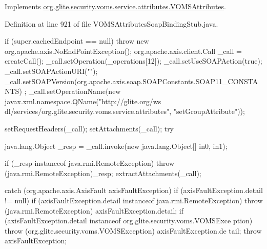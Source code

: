 Implements \hyperlink{interfaceorg_1_1glite_1_1security_1_1voms_1_1service_1_1attributes_1_1VOMSAttributes_aea6d585cbe26db3f11f15cc2b017fb03}{org.glite.security.voms.service.attributes.VOMSAttributes}.



Definition at line 921 of file VOMSAttributesSoapBindingStub.java.


\begin{DoxyCode}
                                                                                 
                                                                                       
                                  {
        if (super.cachedEndpoint == null) {
            throw new org.apache.axis.NoEndPointException();
        }
        org.apache.axis.client.Call _call = createCall();
        _call.setOperation(_operations[12]);
        _call.setUseSOAPAction(true);
        _call.setSOAPActionURI("");
        _call.setSOAPVersion(org.apache.axis.soap.SOAPConstants.SOAP11_CONSTANTS)
      ;
        _call.setOperationName(new javax.xml.namespace.QName("http://glite.org/ws
      dl/services/org.glite.security.voms.service.attributes", "setGroupAttribute"));

        setRequestHeaders(_call);
        setAttachments(_call);
 try {        java.lang.Object _resp = _call.invoke(new java.lang.Object[] {in0, 
      in1});

        if (_resp instanceof java.rmi.RemoteException) {
            throw (java.rmi.RemoteException)_resp;
        }
        extractAttachments(_call);
  } catch (org.apache.axis.AxisFault axisFaultException) {
    if (axisFaultException.detail != null) {
        if (axisFaultException.detail instanceof java.rmi.RemoteException) {
              throw (java.rmi.RemoteException) axisFaultException.detail;
         }
        if (axisFaultException.detail instanceof org.glite.security.voms.VOMSExce
      ption) {
              throw (org.glite.security.voms.VOMSException) axisFaultException.de
      tail;
         }
   }
  throw axisFaultException;
}
    }
\end{DoxyCode}
